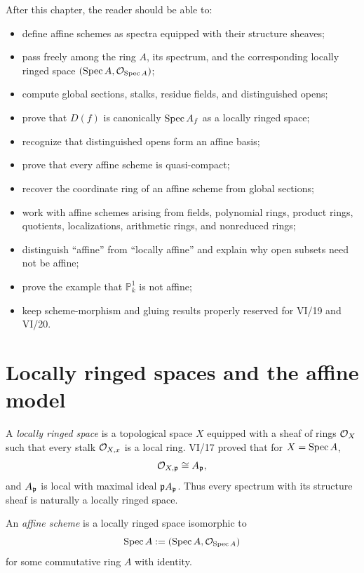 After this chapter, the reader should be able to:
\begin{itemize}
\item define affine schemes as spectra equipped with their structure sheaves;
\item pass freely among the ring $A$, its spectrum, and the corresponding locally ringed
space $(\operatorname{Spec} A,\mathcal O_{\operatorname{Spec} A})$;
\item compute global sections, stalks, residue fields, and distinguished opens;
\item prove that $D(f)$ is canonically $\operatorname{Spec} A_f$ as a locally ringed space;
\item recognize that distinguished opens form an affine basis;
\item prove that every affine scheme is quasi-compact;
\item recover the coordinate ring of an affine scheme from global sections;
\item work with affine schemes arising from fields, polynomial rings, product rings,
quotients, localizations, arithmetic rings, and nonreduced rings;
\item distinguish ``affine'' from ``locally affine'' and explain why open subsets need not
be affine;
\item prove the example that $\mathbb P^1_k$ is not affine;
\item keep scheme-morphism and gluing results properly reserved for VI/19 and VI/20.
\end{itemize}



\section{Locally ringed spaces and the affine model}

A \emph{locally ringed space} is a topological space $X$ equipped with a sheaf of rings
$\mathcal O_X$ such that every stalk $\mathcal O_{X,x}$ is a local ring.  VI/17 proved that for
$X=\operatorname{Spec} A$,
\[
\mathcal O_{X,\mathfrak p}\cong A_{\mathfrak p},
\]
and $A_{\mathfrak p}$ is local with maximal ideal $\mathfrak p A_{\mathfrak p}$.  Thus every spectrum with
its structure sheaf is naturally a locally ringed space.

\begin{definition}
An \emph{affine scheme} is a locally ringed space isomorphic to
\[
  \operatorname{Spec} A := (\operatorname{Spec} A,\mathcal O_{\operatorname{Spec} A})
\]
for some commutative ring $A$ with identity.
\end{definition}

